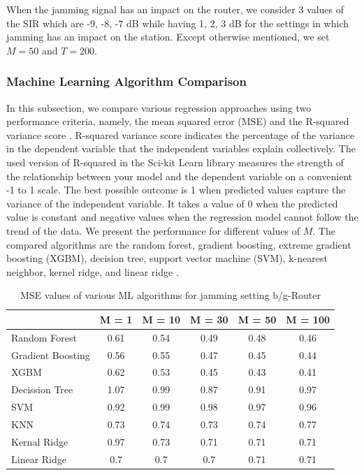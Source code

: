 When the jamming signal has an impact on the router, we consider 3 values of the SIR which are -9, -8, -7 dB while having 1, 2, 3 dB for the settings in which jamming has an impact on the station. Except otherwise mentioned, we set$M = 50$ and $T = 200$. 

\subsubsection{Machine Learning Algorithm Comparison}
In this subsection, we compare various regression approaches using two performance criteria, namely, the mean squared error (MSE) and the R-squared variance score \cite{r-squared}. R-squared variance score indicates the percentage of the variance in the dependent variable that the independent variables explain collectively. The used version of R-squared in the Sci-kit Learn library measures the strength of the relationship between your model and the dependent variable on a convenient -1 to 1 scale. The best possible outcome is 1 when predicted values capture the variance of the independent variable. It takes a value of 0 when the predicted value is constant and negative values when the regression model cannot follow the trend of the data. We present the performance for different values of $M$. The compared algorithms are the random forest, gradient boosting, extreme gradient boosting (XGBM), decision tree, support vector machine (SVM), k-nearest neighbor, kernel ridge, and linear ridge \cite{SCIKITLEARN,Chen:2016:XST:2939672.2939785}. %

\begin{table}[!ht]
	\centering
	\caption{MSE values of various ML algorithms for jamming setting b/g-Router}
	\begin{tabular}{|p{5.3em}|c|c|c|c|c|}
		\toprule
		& \multicolumn{1}{p{2.4em}|}{M = 1} & \multicolumn{1}{p{2.9em}|}{M = 10} & \multicolumn{1}{p{2.9em}|}{M = 30} & \multicolumn{1}{p{2.9em}|}{M = 50} & \multicolumn{1}{p{3.4em}|}{M = 100} \\
		\midrule
		Random Forest	 & 0.61  & 0.54  & 0.49  & 0.48  & 0.46 \\
		\midrule
		Gradient Boosting  & 0.56  & 0.55  & 0.47  & 0.45  & 0.44 \\
		\midrule
		XGBM  & 0.62  & 0.53  & 0.45  & 0.43  & 0.41 \\
		\midrule
		Decission Tree & 1.07  & 0.99  & 0.87  & 0.91  & 0.97 \\
		\midrule
		SVM   & 0.92  & 0.99  & 0.98  & 0.97  & 0.96 \\
		\midrule
		KNN   & 0.73  & 0.74  & 0.73  & 0.74  & 0.77 \\
		\midrule
		Kernal Ridge & 0.97  & 0.73  & 0.71  & 0.71  & 0.71 \\
		\midrule
		Linear Ridge & 0.7   & 0.7   & 0.7   & 0.71  & 0.71 \\
		\bottomrule
	\end{tabular}%
	\label{ftml-jrnl:tab:T1}%
\end{table}%

